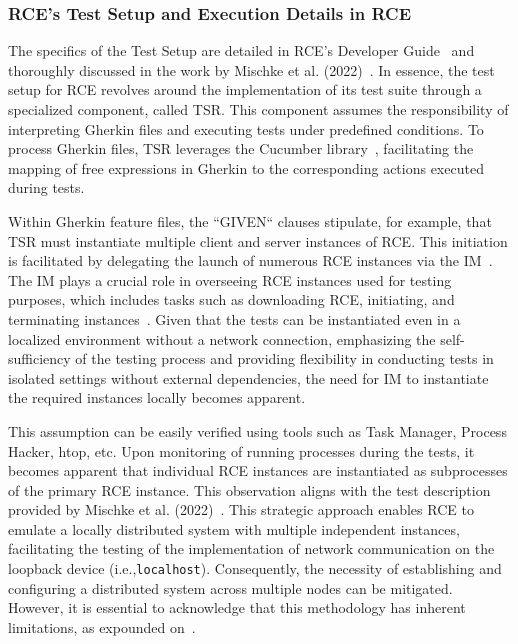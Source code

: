 \subsubsection{\ac{RCE}'s Test Setup and Execution Details in RCE}
The specifics of the Test Setup are detailed in \ac{RCE}'s Developer Guide~\cite{rceDevGuide10x} and thoroughly discussed in the work by Mischke et al. (2022)~\cite{10.1007/978-3-031-08760-8_44}. In essence, the test setup for \ac{RCE} revolves around the implementation of its test suite through a specialized component, called \acf{TSR}. This component assumes the responsibility of interpreting Gherkin files and executing tests under predefined conditions. To process Gherkin files, \ac{TSR} leverages the Cucumber library~\cite{10.1007/978-3-031-08760-8_44}, facilitating the mapping of free expressions in Gherkin to the corresponding actions executed during tests.

Within Gherkin feature files, the ``GIVEN`` clauses stipulate, for example, that \ac{TSR} must instantiate multiple client and server instances of \ac{RCE}. This initiation is facilitated by delegating the launch of numerous \ac{RCE} instances via the \acf{IM}~\cite{rceDevGuide10x}. 
The \ac{IM} plays a crucial role in overseeing \ac{RCE} instances used for testing purposes, which includes tasks such as downloading \ac{RCE}, initiating, and terminating instances~\cite{10.1007/978-3-031-08760-8_44,rceDevGuide10x}. Given that the tests can be instantiated even in a localized environment without a network connection, emphasizing the self-sufficiency of the testing process and providing flexibility in conducting tests in isolated settings without external dependencies, the need for \ac{IM} to instantiate the required instances locally becomes apparent.

This assumption can be easily verified using tools such as Task Manager, Process Hacker, htop, etc. Upon monitoring of running processes during the tests, it becomes apparent that individual \ac{RCE} instances are instantiated as subprocesses of the primary \ac{RCE} instance. This observation aligns with the test description provided by Mischke et al. (2022)~\cite{10.1007/978-3-031-08760-8_44}. This strategic approach enables \ac{RCE} to emulate a locally distributed system with multiple independent instances, facilitating the testing of the implementation of network communication on the loopback device (i.e.,\texttt{localhost}). Consequently, the necessity of establishing and configuring a distributed system across multiple nodes can be mitigated. However, it is essential to acknowledge that this methodology has inherent limitations, as expounded on~.


